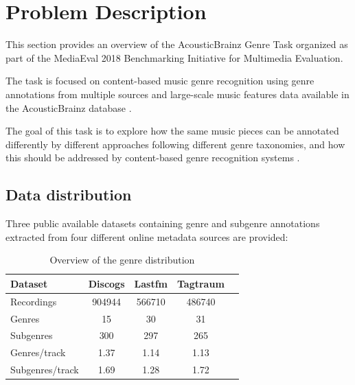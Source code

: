 
\chapter{Problem Description}

\label{problemdescription}

This section provides an overview of the AcousticBrainz Genre Task
organized as part of the MediaEval 2018 Benchmarking Initiative for
Multimedia Evaluation. 

The task is focused on content-based music
genre recognition using genre annotations from multiple sources
and large-scale music features data available in the AcousticBrainz
database \cite{Porter2015}. 

The goal of this task is to explore how the same music
pieces can be annotated differently by different approaches following different genre taxonomies, and how this should be addressed
by content-based genre recognition systems \cite{Bogdanov2018}. 


\section{Data distribution}

Three public available datasets containing genre and subgenre annotations extracted from four different online metadata sources are provided:

\begin{table}[h!]
    \centering
    \begin{tabular}{l c c c c} 
        \hline
        Dataset & Discogs & Lastfm & Tagtraum \\ [0.5ex] 
        \hline
        Recordings & 904944 & 566710 & 486740 \\ 
        Genres & 15 & 30 & 31 \\
        Subgenres & 300 & 297 & 265 \\
        Genres/track  & 1.37 & 1.14 & 1.13 \\
        Subgenres/track & 1.69 & 1.28 & 1.72 \\
        \hline
    \end{tabular}
    \caption{Overview of the genre distribution}
    \label{table:genredist}
\end{table}

